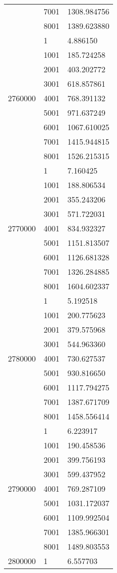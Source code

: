 \begin{table}[htb!]
\begin{tabular}{lll}
 & 7001 & 1308.984756 \\
 & 8001 & 1389.623880 \\
\multirow[c]{9}{*}{2760000} & 1 & 4.886150 \\
 & 1001 & 185.724258 \\
 & 2001 & 403.202772 \\
 & 3001 & 618.857861 \\
 & 4001 & 768.391132 \\
 & 5001 & 971.637249 \\
 & 6001 & 1067.610025 \\
 & 7001 & 1415.944815 \\
 & 8001 & 1526.215315 \\
\multirow[c]{9}{*}{2770000} & 1 & 7.160425 \\
 & 1001 & 188.806534 \\
 & 2001 & 355.243206 \\
 & 3001 & 571.722031 \\
 & 4001 & 834.932327 \\
 & 5001 & 1151.813507 \\
 & 6001 & 1126.681328 \\
 & 7001 & 1326.284885 \\
 & 8001 & 1604.602337 \\
\multirow[c]{9}{*}{2780000} & 1 & 5.192518 \\
 & 1001 & 200.775623 \\
 & 2001 & 379.575968 \\
 & 3001 & 544.963360 \\
 & 4001 & 730.627537 \\
 & 5001 & 930.816650 \\
 & 6001 & 1117.794275 \\
 & 7001 & 1387.671709 \\
 & 8001 & 1458.556414 \\
\multirow[c]{9}{*}{2790000} & 1 & 6.223917 \\
 & 1001 & 190.458536 \\
 & 2001 & 399.756193 \\
 & 3001 & 599.437952 \\
 & 4001 & 769.287109 \\
 & 5001 & 1031.172037 \\
 & 6001 & 1109.992504 \\
 & 7001 & 1385.966301 \\
 & 8001 & 1489.803553 \\
\multirow[c]{9}{*}{2800000} & 1 & 6.557703 \\

\end{tabular}
\end{table}
